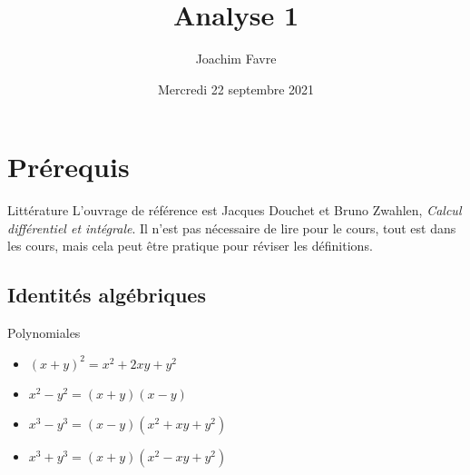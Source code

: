 \documentclass{article}
\title{Analyse 1}
\author{Joachim Favre}
\date{Mercredi 22 septembre 2021}
\begin{document}
\maketitle


\section{Prérequis}

\begin{parag}{Littérature}
    L'ouvrage de référence est Jacques Douchet et Bruno Zwahlen, \textit{Calcul différentiel et intégrale}. Il n'est pas nécessaire de lire pour le cours, tout est dans les cours, mais cela peut être pratique pour réviser les définitions.
\end{parag}

\subsection{Identités algébriques}
\begin{parag}{Polynomiales}
    \begin{itemize}[left=0pt]
        \item $\left(x + y\right)^2 = x^2 + 2xy + y^2$
        \item $x^2 - y^2 = (x + y)(x - y)$
        \item $x^3 - y^3 = (x - y)(x^2 + xy + y^2)$
        \item $x^3 + y^3 = \left(x + y\right)\left(x^2 -xy + y^2\right)$
    \end{itemize}
 
\end{parag}
\end{document}
